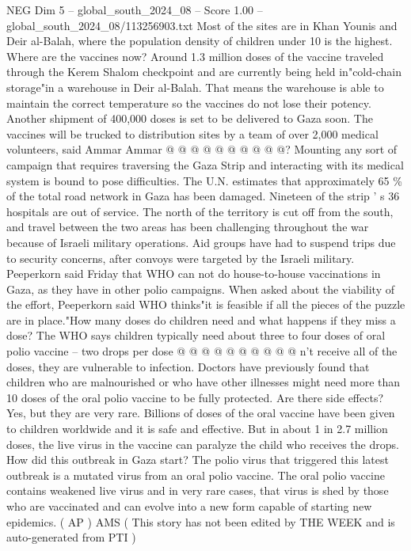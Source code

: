 \begin{textsample}{NEG Dim 5 – global\_south\_2024\_08 – Score 1.00 – global\_south\_2024\_08/113256903.txt}
Most of the sites are in Khan Younis and Deir al-Balah, where the population density of children under 10 is the highest.
Where are the vaccines now?
Around 1.3 million doses of the vaccine traveled through the Kerem Shalom checkpoint and are currently being held in"cold-chain storage"in a warehouse in Deir al-Balah.
That means the warehouse is able to maintain the correct temperature so the vaccines do not lose their potency.
Another shipment of 400,000 doses is set to be delivered to Gaza soon.
The vaccines will be trucked to distribution sites by a team of over 2,000 medical volunteers, said Ammar Ammar @ @ @ @ @ @ @ @ @ @?
Mounting any sort of campaign that requires traversing the Gaza Strip and interacting with its medical system is bound to pose difficulties.
The U.N. estimates that approximately 65 \% of the total road network in Gaza has been damaged.
Nineteen of the strip ' s 36 hospitals are out of service.
The north of the territory is cut off from the south, and travel between the two areas has been challenging throughout the war because of Israeli military operations.
Aid groups have had to suspend trips due to security concerns, after convoys were targeted by the Israeli military.
Peeperkorn said Friday that WHO can not do house-to-house vaccinations in Gaza, as they have in other polio campaigns.
When asked about the viability of the effort, Peeperkorn said WHO thinks"it is feasible if all the pieces of the puzzle are in place."How many doses do children need and what happens if they miss a dose?
The WHO says children typically need about three to four doses of oral polio vaccine -- two drops per dose @ @ @ @ @ @ @ @ @ @ n't receive all of the doses, they are vulnerable to infection.
Doctors have previously found that children who are malnourished or who have other illnesses might need more than 10 doses of the oral polio vaccine to be fully protected.
Are there side effects?
Yes, but they are very rare.
Billions of doses of the oral vaccine have been given to children worldwide and it is safe and effective.
But in about 1 in 2.7 million doses, the live virus in the vaccine can paralyze the child who receives the drops.
How did this outbreak in Gaza start?
The polio virus that triggered this latest outbreak is a mutated virus from an oral polio vaccine.
The oral polio vaccine contains weakened live virus and in very rare cases, that virus is shed by those who are vaccinated and can evolve into a new form capable of starting new epidemics. ( AP ) AMS ( This story has not been edited by THE WEEK and is auto-generated from PTI )

\end{textsample}
